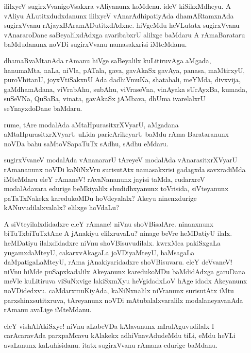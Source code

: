 \begin{mng}
ililxyeV sugirxVvanigoVsakxra vAliyanunx koMdenu. ideV kiSikxMdheyu. A vAliyu ALutitxdudxdanunx ililxyeV vAnarAdhipatiyAda dhamARtamxnAda sugirxVvanu rAjayxBAramADutitxdAdxne. hiVgeMdu heVLutatx sugirxVvanu vAnararoDane saBeyalilxdAdxga avaribabxrU alilxge baMdaru A rAmaBarataru baMdudanunx noVDi sugirxVvanu namasakxrisi iMteMdanu.
\end{mng}

\begin{mng}
dhamaRvaMtanAda rAmanu hiVge saBeyalilx kuLitiruvAga aMgada, hanumaMta, naLa, niVla, pATala, gava, gavAkaSx gavAya, panasa, maMtirxyU, puroVhitanU, joyxVtiSakxnU Ada dadhiVmuKa, shatabali, meYMda, divxvija, gaMdhamAdana, viVrabAhu, subAhu, viVraseVna, vinAyaka sUrAyxBa, kumada, suSeVNa, QuSaBa, vinata, gavAkaSx jAMbava, dhUma ivarelalxrU seYnayxdoDane baMdaru.
\end{mng}

\begin{mng}
rume, tAre modalAda aMtaHpurasitxrXVyarU, aMgadana aMtaHpurasitxrXVyarU uLida paricArikeyarU baMdu rAma Barataranunx noVDa bahu saMtoVSapaTuTx sAdhu, sAdhu eMdaru.
\end{mng}

\begin{mng}
sugirxVvaneV modalAda vAnanararU tAreyeV modalAda vAnarasitxrXVyarU rAmananunx noVDi kaNiNxVru surisutAtx namasakxrisi gadagxda savxradiMda iMteMdaru eleY rAmaneV! rAvaNananunx jayisi taMda, rudarxreV modalAdavara edurige beMkiyalilx shudidhxyanunx toVrisida, siVteyanunx paTaTxNakekx karedukoMDu hoVdeyalalx? Akeyu ninenxdurige kANuvudilalxvalalx? elilxge hoVdaLu?
\end{mng}

\begin{mng}
A siVteyilalxdidadxre eleY rAmane! niVnu shoVBisalAre. ninanxnunx biTuTxbiTuTxtAne A jAnakiyu elilxruvaLu? ninage beVre heMDatiyU ilalx. heMDatiyu ilalxdidadxre niVnu shoVBisuvudilalx. kwrxMca pakiSxgaLa yugamxdaMteyU, cakarxvAkagaLa joVDiyaMteyU, haMsagaLa daMpatigaLaMteyU, rAma jAnakiyaridadxre shoVBisuvaru. eleY deVvaneV! niVnu hiMde puSapxkadalilx Akeyanunx karedukoMDu baMdidAdxga garuDana meVle kuLitiruva viSuNxvige lakiSxmXyu heVgidadxLoV hAge idadx Akeyanunx noVDidedxvu. caMdarxmuKiyAda, kaNiNxnalilx niVranunx surisutAtx iMtu parxshinxsutitxruva, tAreyanunx noVDi mAtubalalxvaralilx modalaneyavanAda rAmanu avaLige iMteMdanu.
\end{mng}

\begin{mng}
eleY vishAlAkiSxye! niVnu aLabeVDa kAlavanunx mIralAguvudilalx I carAcaravAda parxpaMcavu kAlakekx adhiVnavAdudeMdu tiLi, eMdu heVLi avaLanunx kaLuhisidanu. itatx sugirxVvanu rAmana edurige baMdanu.
\end{mng}

